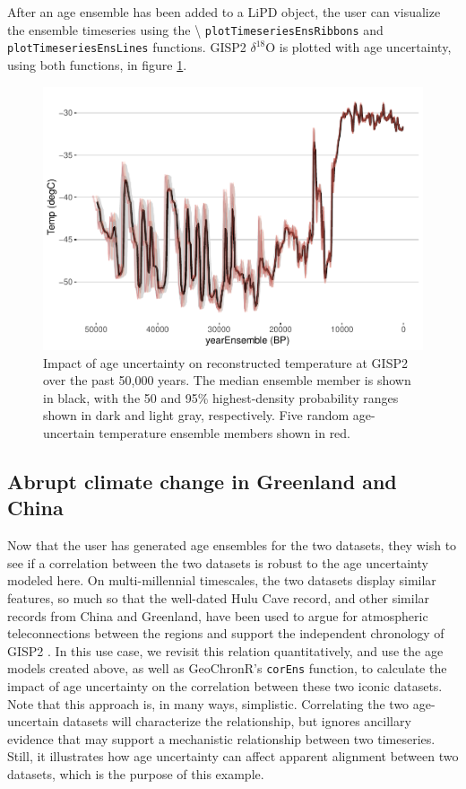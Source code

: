 \documentclass[gchron, manuscript]{copernicus}
\begin{document}
After an age ensemble has been added to a LiPD object, the user can visualize the ensemble timeseries using the \textbackslash{} \texttt{plotTimeseriesEnsRibbons} and \texttt{plotTimeseriesEnsLines} functions.
GISP2 \(\delta^{18}\)O is plotted with age uncertainty, using both functions, in figure \ref{fig:timeseries}.

\begin{figure}
\includegraphics[width=12cm]{geoChronR-paper_files/figure-latex/timeseries-1} \caption{Impact of age uncertainty on reconstructed temperature at GISP2 over the past 50,000 years. The median ensemble member is shown in black, with the 50 and 95\% highest-density probability ranges shown in dark and light gray, respectively. Five random age-uncertain temperature ensemble members shown in red.}\label{fig:timeseries}
\end{figure}

\subsection{Abrupt climate change in Greenland and China}

Now that the user has generated age ensembles for the two datasets, they wish to see if a correlation between the two datasets is robust to the age uncertainty modeled here.
On multi-millennial timescales, the two datasets display similar features, so much so that the well-dated Hulu Cave record, and other similar records from China and Greenland, have been used to argue for atmospheric teleconnections between the regions and support the independent chronology of GISP2 \citep{hulu2001}.
In this use case, we revisit this relation quantitatively, and use the age models created above, as well as GeoChronR's \texttt{corEns} function, to calculate the impact of age uncertainty on the correlation between these two iconic datasets.
Note that this approach is, in many ways, simplistic.
Correlating the two age-uncertain datasets will characterize the relationship, but ignores ancillary evidence that may support a mechanistic relationship between two timeseries.
Still, it illustrates how age uncertainty can affect apparent alignment between two datasets, which is the purpose of this example.
\end{document}
